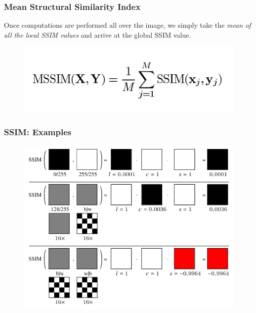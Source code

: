 \documentclass[13.5pt,aspecratio=169, xcolor=dvipsnames]{beamer}
\begin{document}
\begin{frame}
    \onehalfspacing
        \frametitle{Mean Structural Similarity Index}
        
        Once computations are performed all over the image, we simply take the \textit{mean of all the local SSIM values} and arrive at the global SSIM value.

        \begin{figure}[h]
            \centering
            \includegraphics[width=0.7\linewidth]{MSSIM_formula.png}
        \end{figure}
       
\end{frame}
    


\begin{frame}
    \onehalfspacing
        \frametitle{SSIM: Examples}
        
        \begin{figure}
            \centering
            \includegraphics[width=0.8\linewidth]{SSIM_Example_1.png}
        \end{figure}
        
       
\end{frame}
    
\end{document}
